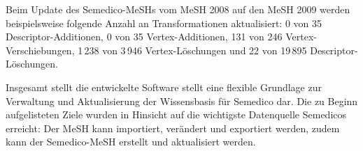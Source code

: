Beim Update des Semedico-MeSHs vom MeSH 2008 auf den MeSH 2009 werden beispielsweise folgende Anzahl an Transformationen aktualisiert: 0 von 35 Descriptor-Additionen, 0 von 35 Vertex-Additionen, 131 von 246 Vertex-Verschiebungen, 1\,238 von 3\,946 Vertex-Löschungen und 22 von 19\,895 Descriptor-Löschungen.

Insgesamt stellt die entwickelte Software stellt eine flexible Grundlage zur Verwaltung und Aktualisierung der Wissensbasis für Semedico dar. Die zu Beginn aufgelisteten Ziele wurden in Hinsicht auf die wichtigste Datenquelle Semedicos erreicht: Der MeSH kann importiert, verändert und exportiert werden, zudem kann der Semedico-MeSH erstellt und aktualisiert werden. 
  